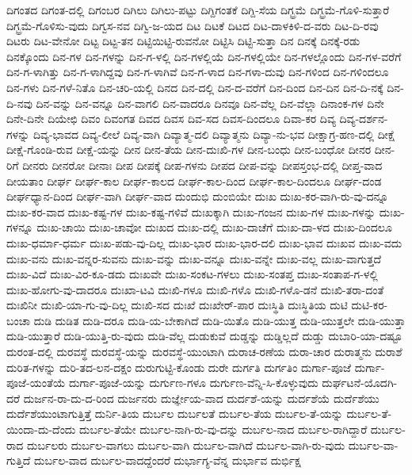 ದಿಗಂತದ
ದಿಗಂತ-ದಲ್ಲಿ
ದಿಗಂಬರ
ದಿಗಿಲು
ದಿಗಿಲು-ಪಟ್ಟು
ದಿಗ್ದಿಗಂತಕೆ
ದಿಗ್ದಿ-ಸೆಯ
ದಿಗ್ಭ್ರಮೆ
ದಿಗ್ಭ್ರಮೆ-ಗೊಳಿ-ಸುತ್ತಾರೆ
ದಿಗ್ಭ್ರಮೆ-ಗೊಳಿಸು-ವುದು
ದಿಗ್ವಸ-ನವ
ದಿಗ್ವಿ-ಜ-ಯದ
ದಿಟ
ದಿಟಕೆ
ದಿಟದ
ದಿಟ-ದಾಳಕಿಳಿ-ದ-ವರು
ದಿಟ-ದಿ-ರವು
ದಿಟರು
ದಿಟ-ವೇನೋ
ದಿಟ್ಟ
ದಿಟ್ಟ-ತನ
ದಿಟ್ಟಿಯಿಟ್ಟಿ-ರುವನೋ
ದಿಟ್ಟಿಸಿ
ದಿಟ್ಟಿ-ಸುತ್ತಾ
ದಿನ
ದಿನಕ್ಕೆ
ದಿನಕ್ಕೆ-ರಡು
ದಿನಕ್ಕೊಂದು
ದಿನ-ಗಳ
ದಿನ-ಗಳನ್ನು
ದಿನ-ಗ-ಳಲ್ಲಿ
ದಿನ-ಗಳಲ್ಲಿಯೆ
ದಿನ-ಗಳಲ್ಲಿಯೇ
ದಿನ-ಗಳಲ್ಲೊಂದು
ದಿನ-ಗಳ-ವರೆಗೆ
ದಿನ-ಗ-ಳಾಗಿತ್ತು
ದಿನ-ಗ-ಳಾಗಿದ್ದವು
ದಿನ-ಗ-ಳಾಗಿವೆ
ದಿನ-ಗ-ಳಾದ
ದಿನ-ಗಳಾ-ದುವು
ದಿನ-ಗಳಿಂದ
ದಿನ-ಗಳಿಂದಲೂ
ದಿನ-ಗಳು
ದಿನ-ಗಳೆ-ನಿತೊ
ದಿನ-ಚರಿ-ಯಲ್ಲಿ
ದಿನದ
ದಿನ-ದಲ್ಲಿ
ದಿನ-ದ-ವರೆಗೆ
ದಿನ-ದಿಂದ
ದಿನ-ದಿನ
ದಿನ-ದಿ-ನಕ್ಕೆ
ದಿನ-ದಿ-ನವು
ದಿನ-ವನ್ನು
ದಿನ-ವನ್ನೂ
ದಿನ-ವಾಗಲಿ
ದಿನ-ವಾದರೂ
ದಿನವೂ
ದಿನ-ವೆಲ್ಲ
ದಿನ-ವೆಲ್ಲಾ
ದಿನಾಂಕ-ಗಳ
ದಿನೇ
ದಿನೇ-ದಿನೇ
ದಿಯೇಛಿ
ದಿವಂ
ದಿವಂಗತ
ದಿವದ
ದಿವಸ
ದಿವ-ಸದ
ದಿವಸ-ದಿಂದಲೂ
ದಿವಾ-ಕರ
ದಿವ್ಯ
ದಿವ್ಯ-ದರ್ಶನ-ಗಳನ್ನು
ದಿವ್ಯ-ಭಾವದ
ದಿವ್ಯ-ಲೀಲೆ
ದಿವ್ಯ-ವಾಗಿ
ದಿವ್ಯಾತ್ಮ-ದಲಿ
ದಿವ್ಯಾತ್ಮನು
ದಿವ್ಯಾ-ನು-ಭವ
ದೀಕ್ಷಾಗ್ರ-ಹಣ-ದಲ್ಲಿ
ದೀಕ್ಷೆ
ದೀಕ್ಷೆ-ಗೊಂಡಿ-ರುವ
ದೀಕ್ಷೆ-ಯನ್ನು
ದೀನ
ದೀನ-ತೆಯ
ದೀನ-ದುಃಖಿ-ಗಳ
ದೀನ-ಬಂಧು
ದೀನ-ಬಂಧೋ
ದೀನರ
ದೀನ-ರಿಗೆ
ದೀನರು
ದೀನರೋ
ದೀನಾಃ
ದೀಪ
ದೀಪಕ್ಕೆ
ದೀಪ-ಗಳನು
ದೀಪದ
ದೀಪ-ವನ್ನು
ದೀಪಸ್ತಂಭ-ದಲ್ಲಿ
ದೀಪ್ತ-ವಾದ
ದೀಯತಾಂ
ದೀರ್ಘ
ದೀರ್ಘ-ಕಾಲ
ದೀರ್ಘ-ಕಾಲದ
ದೀರ್ಘ-ಕಾಲ-ದಿಂದ
ದೀರ್ಘ-ಕಾಲ-ದಿಂದಲೂ
ದೀರ್ಘ-ದಂಡ
ದೀರ್ಘಧ್ಯಾನ-ದಿಂದ
ದೀರ್ಘ-ವಾಗಿ
ದೀರ್ಘ-ವಾದ
ದುಂದುಭಿ
ದುಂಬಿಯೇ
ದುಃಖ
ದುಃಖ-ಕರ-ವಾಗಿ-ರು-ವು-ದನ್ನೂ
ದುಃಖ-ಕರ-ವಾದ
ದುಃಖ-ಕಷ್ಟ-ಗಳ
ದುಃಖ-ಕಷ್ಟ-ಗಳಿವೆ
ದುಃಖಕ್ಕಾಗಿ
ದುಃಖ-ಗಂಜನ
ದುಃಖ-ಗಳ
ದುಃಖ-ಗಳನ್ನು
ದುಃಖ-ಗಳನ್ನೂ
ದುಃಖ-ಚಾಯಿ
ದುಃಖ-ಚಾವೋ
ದುಃಖದ
ದುಃಖ-ದಲ್ಲಿ
ದುಃಖ-ದಾಚೆಗೆ
ದುಃಖ-ದಾ-ಳದ
ದುಃಖ-ದಿಂದಲೂ
ದುಃಖ-ಧರ್ಮಾ-ಧರ್ಮ
ದುಃಖ-ಪಡು-ವು-ದಿಲ್ಲ
ದುಃಖ-ಭಾರ
ದುಃಖ-ಭಾರ-ದಲಿ
ದುಃಖ-ಭಾವ
ದುಃಖವ
ದುಃಖ-ವದು
ದುಃಖ-ವನು
ದುಃಖ-ವನ್ನರ-ಸುವನು
ದುಃಖ-ವನ್ನು
ದುಃಖ-ವನ್ನೂ
ದುಃಖ-ವನ್ನೇ
ದುಃಖ-ವಲ್ಲ
ದುಃಖ-ವಾಗುತ್ತದೆ
ದುಃಖ-ವಿದೆ
ದುಃಖ-ವಿರ-ಕೂ-ಡದು
ದುಃಖವೇ
ದುಃಖ-ಸಂಕಟ-ಗಳಲು
ದುಃಖ-ಸಂತಪ್ತ
ದುಃಖ-ಸಂತಾಪ-ಗ-ಳಲ್ಲಿ
ದುಃಖ-ಹೋಗು-ವು-ದಾದರೂ
ದುಃಖಾ-ಟವಿ
ದುಃಖಿ-ಗಳೂ
ದುಃಖಿ-ಗಳೊ
ದುಃಖಿ-ಗಳೊ-ಡನೆ
ದುಃಖಿ-ತರಾ-ದಂತೆ
ದುಃಖಿನೀ
ದುಃಖಿ-ಯಾ-ಗು-ವು-ದಿಲ್ಲ
ದುಃಖಿ-ಸದ
ದುಃಖೆ
ದುಃಖೇರ್‌-ಪಾರ
ದುಃಸ್ಥಿತಿ
ದುಃಸ್ಥಿತಿಯ
ದುಟಿ
ದುಟಿ-ಕರ-ಬಂಚಾ
ದುಡಿ
ದುಡಿತ
ದುಡಿ-ದರೂ
ದುಡಿ-ಯ-ಬೇಕಾಗಿದೆ
ದುಡಿ-ಯಿತೊ
ದುಡಿ-ಯುತ್ತ
ದುಡಿ-ಯುತ್ತಲೇ
ದುಡಿ-ಯುತ್ತಾ
ದುಡಿ-ಯುತ್ತಾರೆ
ದುಡಿ-ಯುತ್ತಿ-ರು-ವುದು
ದುಡಿ-ವೆಲ್ಲ
ದುಡುಕುವೆ
ದುಡ್ಡನ್ನು
ದುಡ್ಡಿಲ್ಲದೆ
ದುಡ್ಡು
ದುಬಾರಿ-ಯಾ-ದಷ್ಟೂ
ದುರಂತ-ದಲ್ಲಿ
ದುರವಸ್ಥೆ
ದುರವಸ್ಥೆ-ಯನ್ನು
ದುರವಸ್ಥೆ-ಯುಂಟಾಗಿ
ದುರಾಚ-ರಣೆಯ
ದುರಾ-ಚಾರ
ದುರಾತ್ಮನು
ದುರಾಶೆ
ದುರಿತ-ಗಳನ್ನು
ದುರಿ-ತದ-ಲನ-ದಕ್ಷಂ
ದುರುಗುಟ್ಟಿ-ಕೊಂಡು
ದುರೇ
ದುರ್ಗತಿ
ದುರ್ಗತಿಂ
ದುರ್ಗಾ-ಪೂಜೆ
ದುರ್ಗಾ-ಪೂಜೆ-ಯಂತೆಯೆ
ದುರ್ಗಾ-ಪೂಜೆ-ಯನ್ನು
ದುರ್ಗುಣ-ಗಳೂ
ದುರ್ಗುಣ-ವೆನ್ನಿ-ಸಿ-ಕೊಳ್ಳುವುದು
ದುರ್ಘಟನೆ-ಯೊದಗಿ-ದರೆ
ದುರ್ಜನ-ರಾ-ದು-ದ-ರಿಂದ
ದುರ್ಜನರು
ದುರ್ಜ್ಞೇಯ-ವಾದ
ದುರ್ದಶೆ-ಯನ್ನು
ದುರ್ದಶೆಯೆ
ದುರ್ದೆಶೆಯು
ದುರ್ದೆಶೆಯುಂಟಾಗುತ್ತಿತ್ತೆ
ದುರ್ನಿ-ತಿಯ
ದುರ್ಬಲ
ದುರ್ಬಲತೆ
ದುರ್ಬಲ-ತೆಯ
ದುರ್ಬಲ-ತೆ-ಯನ್ನು
ದುರ್ಬಲ-ತೆ-ಯಿಂದಾ-ದು-ದೆಂದು
ದುರ್ಬಲ-ತೆಯೇ
ದುರ್ಬಲ-ನಾಗಿ-ರು-ವು-ದನ್ನು
ದುರ್ಬಲ-ನಾದ
ದುರ್ಬಲ-ರಾಗಿದ್ದಾರೆ
ದುರ್ಬಲ-ರಾದ
ದುರ್ಬಲರು
ದುರ್ಬಲ-ವಾಗಲು
ದುರ್ಬಲ-ವಾಗಿ
ದುರ್ಬಲ-ವಾಗಿದೆ
ದುರ್ಬಲ-ವಾಗಿ-ರು-ವುದು
ದುರ್ಬಲ-ವಾ-ಗುತ್ತಿದೆ
ದುರ್ಬಲ-ವಾದ
ದುರ್ಬಲ-ವಾದದ್ದೆಂದರೆ
ದುರ್ಭಾಗ್ಯ-ವೆನ್ನ
ದುರ್ಭಾವ
ದುರ್ಭಿಕ್ಷ
